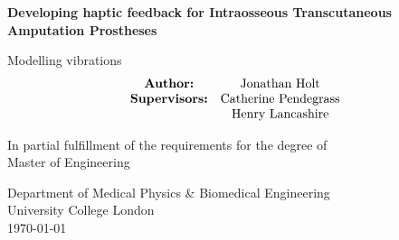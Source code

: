 \begin{titlepage}
    \begin{center}
        \vspace*{1cm}
            
        \huge
        \textbf{Developing haptic feedback for Intraosseous Transcutaneous Amputation Prostheses}
            
        \vspace{0.5cm}
        \Large
            Modelling vibrations
        \vspace{1.5cm} \begin{align*}
            \begin{matrix}
                \text{\textbf{Author:}} & \text{Jonathan Holt} \\
                \textbf{Supervisors:} & \text{Catherine Pendegrass} \\
                & \text{Henry Lancashire}
            \end{matrix} \end{align*}

            
        \vfill
            
        In partial fulfillment of the requirements for the degree of \\
        Master of Engineering
            
        \vspace{0.8cm}
            
        \large
        Department of Medical Physics \& Biomedical Engineering\\
        University College London\\
        \today \\
            
    \end{center}
\end{titlepage}